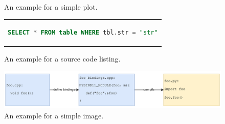 \begin{figure}[htpb]
  \centering

  \exampleA
  \exampleB
  \caption[Example plot]{An example for a simple plot.}\label{fig:sample-plot}
\end{figure}

\begin{figure}[htpb]
  \centering
  \begin{tabular}{c}
  \begin{lstlisting}[language=SQL]
    SELECT * FROM table WHERE tbl.str = "str"
  \end{lstlisting}
  \end{tabular}
  \caption[Example listing]{An example for a source code listing.}\label{fig:sample-listing}
\end{figure}

\begin{figure}[htpb]
  \centering
  \includegraphics[width=\textwidth]{../figures/pybind_schema.png}
  \caption[Example image]{An example for a simple image.}\label{fig:sample-image}
\end{figure}



